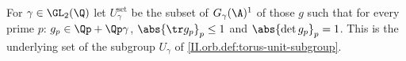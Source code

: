 For $\gamma\in\GL_2(\Q)$ let $U_\gamma^{\mathrm{set}}$ be the subset of $G_\gamma(\A)^1$ of those $g$ such that for every prime $p$: $g_p\in\Qp+\Qp\gamma$, $\abs{\tr g_p}_p\le1$ and
$\abs{\det g_p}_p=1$. This is the underlying set of the subgroup $U_\gamma$ of \cref{II.orb.def:torus-unit-subgroup}.
